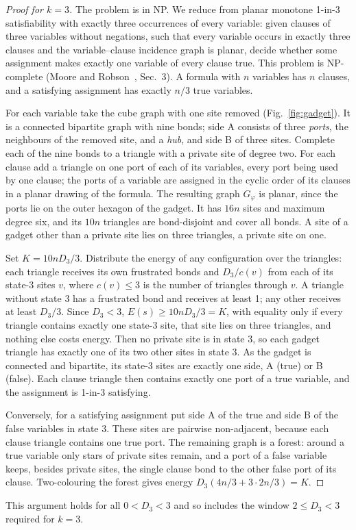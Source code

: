 \documentclass[aps,pre,twocolumn,floatfix,10pt]{revtex4-2}
\theoremstyle{definition}
\theoremstyle{remark}
\begin{document}
\begin{proof}[Proof for $k=3$]
The problem is in NP. We reduce from planar monotone 1-in-3 satisfiability with exactly three
occurrences of every variable: given clauses of three variables without negations, such that
every variable occurs in exactly three clauses and the variable--clause incidence graph is planar,
decide whether some assignment makes exactly one variable of every clause true. This problem is
NP-complete (Moore and Robson~\cite{MooreRobson2001}, Sec.~3). A formula with $n$ variables has
$n$ clauses, and a satisfying assignment has exactly $n/3$ true variables.

For each variable take the cube graph with one site removed (Fig.~\ref{fig:gadget}). It is a
connected bipartite graph with nine bonds; side A consists of three \emph{ports}, the neighbours of
the removed site, and a \emph{hub}, and side B of three sites. Complete each of the nine bonds to
a triangle with a private site of degree two. For each clause add a triangle on one port of each
of its variables, every port being used by one clause; the ports of a variable are assigned in the
cyclic order of its clauses in a planar drawing of the formula. The resulting graph $G_\varphi$ is
planar, since the ports lie on the outer hexagon of the gadget. It has $16n$ sites and maximum
degree six, and its $10n$ triangles are bond-disjoint and cover all bonds. A site of a gadget
other than a private site lies on three triangles, a private site on one.

Set $K=10nD_3/3$. Distribute the energy of any configuration over the triangles: each triangle
receives its own frustrated bonds and $D_3/c(v)$ from each of its state-3 sites $v$, where
$c(v)\le3$ is the number of triangles through $v$. A triangle without state 3 has a frustrated
bond and receives at least 1; any other receives at least $D_3/3$. Since $D_3<3$,
$E(s)\ge10nD_3/3=K$, with equality only if every triangle contains exactly one state-3 site, that
site lies on three triangles, and nothing else costs energy. Then no private site is in state 3,
so each gadget triangle has exactly one of its two other sites in state 3. As the gadget is
connected and bipartite, its state-3 sites are exactly one side, A (true) or B (false). Each clause
triangle then contains exactly one port of a true variable, and the assignment is 1-in-3
satisfying.

Conversely, for a satisfying assignment put side A of the true and side B of the false variables
in state 3. These sites are pairwise non-adjacent, because each clause triangle contains one true
port. The remaining graph is a forest: around a true variable only stars of private sites remain,
and a port of a false variable keeps, besides private sites, the single clause bond to the other
false port of its clause. Two-colouring the forest gives energy $D_3(4n/3+3\cdot2n/3)=K$.
\end{proof}
This argument holds for all $0<D_3<3$ and so includes the window $2\le D_3<3$ required for $k=3$.
\end{document}
